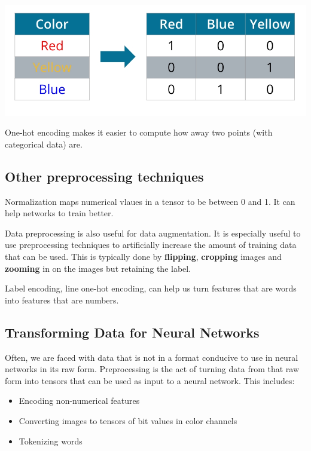 \includegraphics[width=1\linewidth]{img//intro/screen-shot-2022-06-27-at-11.16.07-am.jpeg}

One-hot encoding makes it easier to compute how away two points (with categorical data) are.

\subsection{Other preprocessing techniques}

Normalization maps numerical vlaues in a tensor to be between 0 and 1. It can help networks to train better.

Data preprocessing is also useful for data augmentation. It is especially useful to use preprocessing techniques to artificially increase the amount of training data that can be used. This is typically done by \textbf{flipping}, \textbf{cropping} images and \textbf{zooming} in on the images but retaining the label.

Label encoding, line one-hot encoding, can help us turn features that are words into features that are numbers. 

\subsection{Transforming Data for Neural Networks}

Often, we are faced with data that is not in a format conducive to use in neural networks in its raw form. Preprocessing is the act of turning data from that raw form into tensors that can be used as input to a neural network. This includes:

\begin{itemize}
    \item Encoding non-numerical features
    \item Converting images to tensors of bit values in color channels
    \item Tokenizing words
\end{itemize}

